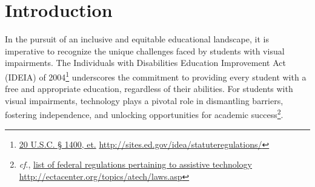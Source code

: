 \documentclass[12pt,letterpaper,twoside,openright]{report}
\title{\Huge ENHANCING EDUCATIONAL EQUITY: \vskip2em \Large A Comprehensive Exploration of Technology Needs for Students with Visual Impairments}
\author{Michael Ryan Hunsaker, M.Ed., Ph.D.}
\date{\vfill \textit{Last Updated: {\today}}}
\renewcommand{\cftchapleader}{\cftdotfill{\cftdotsep}}
\begin{document}
\raggedbottom
\raggedright
{}
\maketitle
{}
\dominitoc
\setcounter{minitocdepth}{1}
\setcounter{tocdepth}{1}
\cleardoublepage
\fancyhead{}
\fancyfoot{}
\tableofcontents
{}
{\vskip-10pt\listoffigures\let\clearpage\relax\vskip-10pt\listoftables}
\newpage{}
\fancyhead{}
\fancyfoot{}

\hypertarget{intro}{}\chapter*{Introduction}\label{intro}
\renewcommand{\cftchapleader}{\cftdotfill{\cftdotsep}}
\pagestyle{fancyplain}
\fancyfoot[C]{\thepage}
In the pursuit of an inclusive and equitable educational landscape, it is imperative to recognize the unique challenges faced by students with visual impairments. The Individuals with Disabilities Education Improvement Act (IDEIA) of 2004\footnote{\raggedright \href{http://sites.ed.gov/idea/statuteregulations/}{20 U.S.C. § 1400, et.} \url{http://sites.ed.gov/idea/statuteregulations/}} underscores the commitment to providing every student with a free and appropriate education, regardless of their abilities. For students with visual impairments, technology plays a pivotal role in dismantling barriers, fostering independence, and unlocking opportunities for academic success\footnote{\raggedright \textit{cf}., \href{http://ectacenter.org/topics/atech/laws.asp}{list of federal regulations pertaining to assistive technology} \hfill\break\url{http://ectacenter.org/topics/atech/laws.asp}}.
\end{document}
